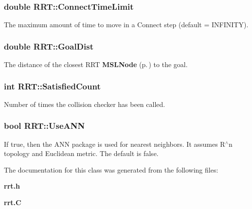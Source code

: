 \subsubsection{\setlength{\rightskip}{0pt plus 5cm}double RRT::Connect\-Time\-Limit}\label{classRRT_m3}


The maximum amount of time to move in a Connect step (default = INFINITY).

\subsubsection{\setlength{\rightskip}{0pt plus 5cm}double RRT::Goal\-Dist}\label{classRRT_m1}


The distance of the closest RRT {\bf MSLNode} {\rm (p.\,\pageref{classMSLNode})} to the goal.

\subsubsection{\setlength{\rightskip}{0pt plus 5cm}int RRT::Satisfied\-Count}\label{classRRT_m4}


Number of times the collision checker has been called.

\subsubsection{\setlength{\rightskip}{0pt plus 5cm}bool RRT::Use\-ANN}\label{classRRT_m0}


If true, then the ANN package is used for nearest neighbors. It assumes R$^\wedge$n topology and Euclidean metric. The default is false.



The documentation for this class was generated from the following files:\begin{CompactItemize}
\item 
{\bf rrt.h}\item 
{\bf rrt.C}\end{CompactItemize}

